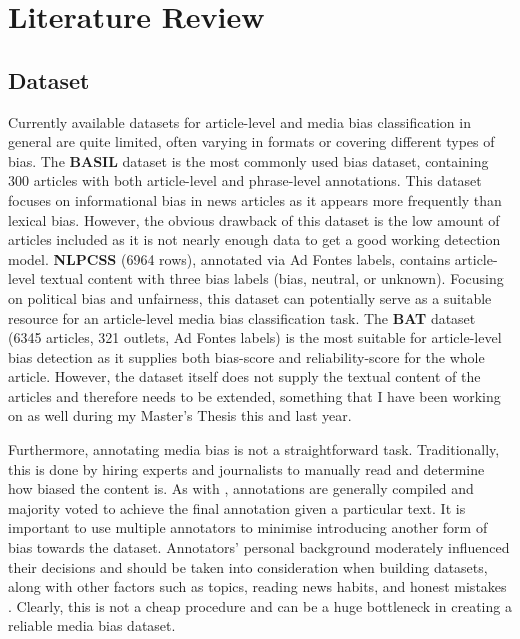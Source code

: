\chapter{Literature Review}
\label{cha:3}

\section{Dataset}

Currently available datasets for article-level and media bias classification in general are quite limited, often varying in formats or covering different types of bias. The \textbf{BASIL} dataset \cite{fan-2019-basil} is the most commonly used bias dataset, containing 300 articles with both article-level and phrase-level annotations. This dataset focuses on informational bias in news articles as it appears more frequently than lexical bias. However, the obvious drawback of this dataset is the low amount of articles included as it is not nearly enough data to get a good working detection model. \textbf{NLPCSS} \cite{chen-2020-nlpcss} (6964 rows), annotated via Ad Fontes labels, contains article-level textual content with three bias labels (bias, neutral, or unknown). Focusing on political bias and unfairness, this dataset can potentially serve as a suitable resource for an article-level media bias classification task. The \textbf{BAT} \cite{spinde-2023-bat} dataset (6345 articles, 321 outlets, Ad Fontes labels) is the most suitable for article-level bias detection as it supplies both bias-score and reliability-score for the whole article. However, the dataset itself does not supply the textual content of the articles and therefore needs to be extended, something that I have been working on as well during my Master's Thesis this and last year.

Furthermore, annotating media bias is not a straightforward task. Traditionally, this is done by hiring experts and journalists to manually read and determine how biased the content is. As with \cite{spinde-2021-babe}, annotations are generally compiled and majority voted to achieve the final annotation given a particular text. It is important to use multiple annotators to minimise introducing another form of bias towards the dataset. Annotators' personal background moderately influenced their decisions and should be taken into consideration when building datasets, along with other factors such as topics, reading news habits, and honest mistakes \cite{spinde-2021-bias-words}. Clearly, this is not a cheap procedure and can be a huge bottleneck in creating a reliable media bias dataset.

